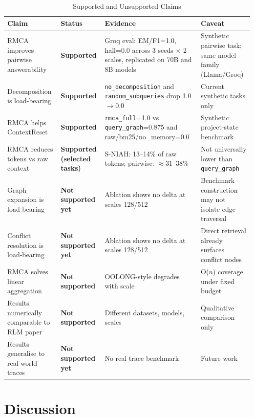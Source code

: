 \documentclass[conference]{IEEEtran}
\begin{document}
\begin{table}[htbp]
\caption{Supported and Unsupported Claims}
\label{tab:claims}
\centering
\begin{tabular}{p{3.5cm}p{1.8cm}p{4.5cm}p{3.5cm}}
\toprule
\textbf{Claim} & \textbf{Status} & \textbf{Evidence} & \textbf{Caveat} \\
\midrule
RMCA improves pairwise answerability & \textbf{Supported} & Groq eval: EM/F1=1.0, hall=0.0 across 3 seeds $\times$ 2 scales, replicated on 70B and 8B models & Synthetic pairwise task; same model family (Llama/Groq) \\
\midrule
Decomposition is load-bearing & \textbf{Supported} & \texttt{no\_decomposition} and \texttt{random\_subqueries} drop 1.0$\to$0.0 & Current synthetic tasks only \\
\midrule
RMCA helps ContextReset & \textbf{Supported} & \texttt{rmca\_full}=1.0 vs \texttt{query\_graph}=0.875 and raw/bm25/no\_memory=0.0 & Synthetic project-state benchmark \\
\midrule
RMCA reduces tokens vs raw context & \textbf{Supported (selected tasks)} & S-NIAH: 13--14\% of raw tokens; pairwise: $\approx$31--38\% & Not universally lower than \texttt{query\_graph} \\
\midrule
Graph expansion is load-bearing & \textbf{Not supported yet} & Ablation shows no delta at scales 128/512 & Benchmark construction may not isolate edge traversal \\
\midrule
Conflict resolution is load-bearing & \textbf{Not supported yet} & Ablation shows no delta at scales 128/512 & Direct retrieval already surfaces conflict nodes \\
\midrule
RMCA solves linear aggregation & \textbf{Not supported} & OOLONG-style degrades with scale & O($n$) coverage under fixed budget \\
\midrule
Results numerically comparable to RLM paper & \textbf{Not supported} & Different datasets, models, scales & Qualitative comparison only \\
\midrule
Results generalise to real-world traces & \textbf{Not supported yet} & No real trace benchmark & Future work \\
\bottomrule
\end{tabular}
\end{table}


\section{Discussion}
\end{document}
